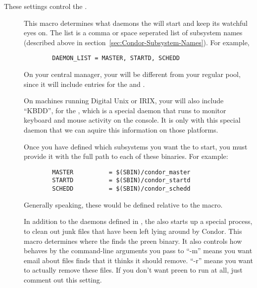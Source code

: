 These settings control the .
\begin{description}
  
\item[] \label{param:DaemonList} This macro
  determines what daemons the  will start and keep its
  watchful eyes on.  The list is a comma or space seperated list of
  subsystem names (described above in
  section~\ref{sec:Condor-Subsystem-Names}).  For example,
\begin{verbatim}
        DAEMON_LIST = MASTER, STARTD, SCHEDD
\end{verbatim}

  \Note On your central manager, your 
  will be different from your regular pool, since it will include
  entries for the  and .  
  
  \Note On machines running Digital Unix or IRIX, your
   will also include ``KBDD'', for the
  , which is a special daemon that runs to monitor
  keyboard and mouse activity on the console.  It is only with this
  special daemon that we can aquire this information on those
  platforms. 

\item[] \label{param:SUBSYS} Once you have defined which
  subsystems you want the  to start, you must provide
  it with the full path to each of these binaries.  For example:
\begin{verbatim}
        MASTER          = $(SBIN)/condor_master
        STARTD          = $(SBIN)/condor_startd
        SCHEDD          = $(SBIN)/condor_schedd
\end{verbatim}
  Generally speaking, these would be defined relative to the
   macro.
  
\item[] \label{param:Preen} In addition to the daemons
  defined in , the  also starts up
  a special process,  to clean out junk files that have
  been left lying around by Condor.  This macro determines where the
   finds the preen binary.  It also controls how
   behaves by the command-line arguments you pass to
  ``-m'' means you want email about files  finds that it
  thinks it should remove.  ``-r'' means you want  to
  actually remove these files.  If you don't want preen to run at all,
  just comment out this setting.


\end{description}
